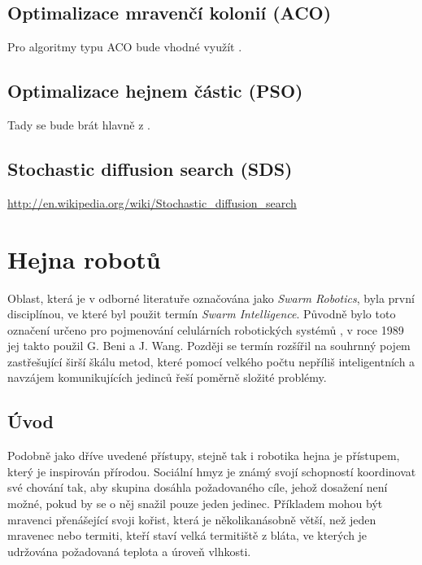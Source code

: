 \documentclass[a4paper,12pt]{article}
\begin{document}
\subsection{Optimalizace mravenčí kolonií (ACO)}
Pro algoritmy typu ACO bude vhodné využít \cite{Dorigo06antcolony}.

\subsection{Optimalizace hejnem částic (PSO)}
Tady se bude brát hlavně z \cite{Blum08SwarmOpt}.

\subsection{Stochastic diffusion search (SDS)}
\url{http://en.wikipedia.org/wiki/Stochastic_diffusion_search}

\newpage


\section{Hejna robotů}
Oblast, která je v odborné literatuře označována jako {\it Swarm Robotics}, byla první
disciplínou, ve které byl použit termín {\it Swarm Intelligence}. Původně bylo toto
označení určeno pro pojmenování celulárních robotických systémů \cite{BeniWang89}, v roce
1989 jej takto použil G. Beni a J. Wang. Později se termín rozšířil na souhrnný pojem
zastřešující širší škálu metod, které pomocí velkého počtu nepříliš inteligentních
a navzájem komunikujících jedinců řeší poměrně složité problémy.

\subsection{Úvod}
Podobně jako dříve uvedené přístupy, stejně tak i robotika hejna je přístupem, který
je inspirován přírodou. Sociální hmyz je známý svojí schopností koordinovat své
chování tak, aby skupina dosáhla požadovaného cíle, jehož dosažení není možné,
pokud by se o něj snažil pouze jeden jedinec. Příkladem mohou být mravenci
přenášející svoji kořist, která je několikanásobně větší, než jeden mravenec
nebo termiti, kteří staví velká termitiště z bláta, ve kterých je udržována
požadovaná teplota a úroveň vlhkosti.
\end{document}
